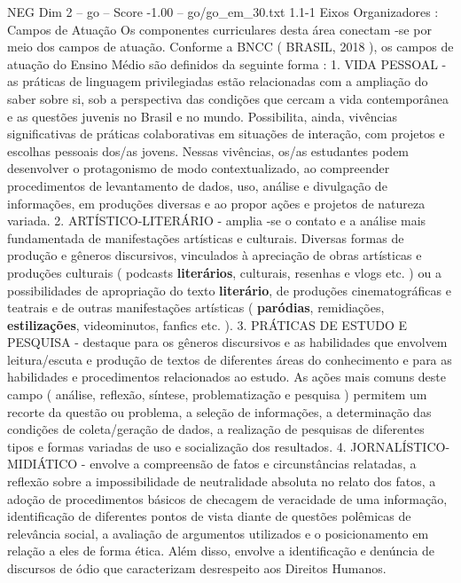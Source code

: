 \begin{textsample}{NEG Dim 2 – go – Score -1.00 – go/go\_em\_30.txt}  \label{ex:f2_neg_120}
1.1-1 Eixos Organizadores : Campos de Atuação Os componentes curriculares desta área conectam -se por meio dos campos de atuação.
Conforme a BNCC ( BRASIL, 2018 ), os campos de atuação do Ensino Médio são definidos da seguinte forma : 1.
VIDA PESSOAL - as práticas de linguagem privilegiadas estão relacionadas com a ampliação do saber sobre si, sob a perspectiva das condições que cercam a vida contemporânea e as questões juvenis no Brasil e no mundo.
Possibilita, ainda, vivências significativas de práticas colaborativas em situações de interação, com projetos e escolhas pessoais dos/as jovens.
Nessas vivências, os/as estudantes podem desenvolver o protagonismo de modo contextualizado, ao compreender procedimentos de levantamento de dados, uso, análise e divulgação de informações, em produções diversas e ao propor ações e projetos de natureza variada. 2.
ARTÍSTICO-LITERÁRIO - amplia -se o contato e a análise mais fundamentada de manifestações artísticas e culturais.
Diversas formas de produção e gêneros discursivos, vinculados à apreciação de obras artísticas e produções culturais ( podcasts \textbf{literários}, culturais, resenhas e vlogs etc. ) ou a possibilidades de apropriação do texto \textbf{literário}, de produções cinematográficas e teatrais e de outras manifestações artísticas ( \textbf{paródias}, remidiações, \textbf{estilizações}, videominutos, fanfics etc. ). 3.
PRÁTICAS DE ESTUDO E PESQUISA - destaque para os gêneros discursivos e as habilidades que envolvem leitura/escuta e produção de textos de diferentes áreas do conhecimento e para as habilidades e procedimentos relacionados ao estudo.
As ações mais comuns deste campo ( análise, reflexão, síntese, problematização e pesquisa ) permitem um recorte da questão ou problema, a seleção de informações, a determinação das condições de coleta/geração de dados, a realização de pesquisas de diferentes tipos e formas variadas de uso e socialização dos resultados. 4.
JORNALÍSTICO-MIDIÁTICO - envolve a compreensão de fatos e circunstâncias relatadas, a reflexão sobre a impossibilidade de neutralidade absoluta no relato dos fatos, a adoção de procedimentos básicos de checagem de veracidade de uma informação, identificação de diferentes pontos de vista diante de questões polêmicas de relevância social, a avaliação de argumentos utilizados e o posicionamento em relação a eles de forma ética.
Além disso, envolve a identificação e denúncia de discursos de ódio que caracterizam desrespeito aos Direitos Humanos.

\end{textsample}
